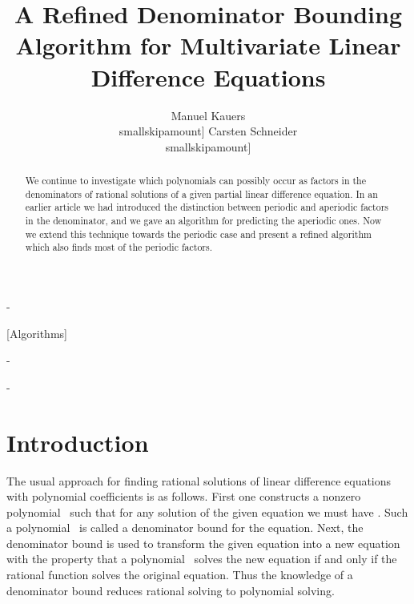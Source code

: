 \documentclass[a4paper]{sig-alternate}
\begin{document}
\title{A Refined Denominator Bounding Algorithm for Multivariate Linear Difference Equations}

\author{
 \alignauthor Manuel Kauers\\smallskipamount]
 \alignauthor Carsten Schneider\\smallskipamount]
}

\maketitle

\begin{abstract}
  We continue to investigate which polynomials can possibly occur as factors in the
  denominators of rational solutions of a given partial linear difference equation.
  In an earlier article we had introduced the distinction between periodic and
  aperiodic factors in the denominator, and we gave an algorithm for predicting
  the aperiodic ones. Now we extend this technique towards the periodic case
  and present a refined algorithm which also finds most of the periodic factors.
\end{abstract}

\kern-\medskipamount

[Algorithms]

\kern-\medskipamount


\kern-\medskipamount


\section{Introduction}

The usual approach for finding rational solutions of linear difference equations
with polynomial coefficients is as follows. First one constructs a nonzero polynomial~ such
that for any solution  of the given equation we must have .
Such a polynomial~ is called a denominator bound for the equation.  Next, the
denominator bound is used to transform the given equation into a new equation
with the property that a polynomial~ solves the new equation if and only if
the rational function  solves the original equation.  Thus the
knowledge of a denominator bound reduces rational solving to polynomial solving.
\end{document}
